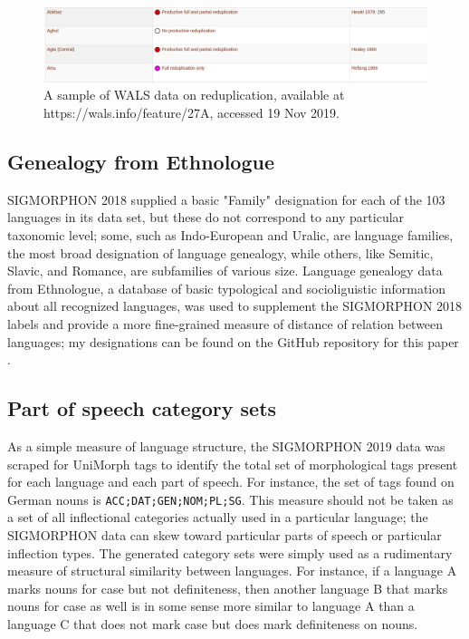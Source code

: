 \begin{figure}[ht]
\includegraphics[width=13.5cm]{images/WALS.png}
\centering
\caption{A sample of WALS data on reduplication, available at\\ https://wals.info/feature/27A, accessed 19 Nov 2019.}
\end{figure}

\subsection{Genealogy from Ethnologue}

SIGMORPHON 2018 supplied a basic "Family" designation for each of the 103 languages in its data set, but these do not correspond to any particular taxonomic level; some, such as Indo-European and Uralic, are language families, the most broad designation of language genealogy, while others, like Semitic, Slavic, and Romance, are subfamilies of various size. Language genealogy data from Ethnologue, a database of basic typological and socioliguistic information about all recognized languages, was used to supplement the SIGMORPHON 2018 labels and provide a more fine-grained measure of distance of relation between languages; my designations can be found on the GitHub repository for this paper \parencite{Ethnologue}.

\subsection{Part of speech category sets}

As a simple measure of language structure, the SIGMORPHON 2019 data was scraped for UniMorph tags to identify the total set of morphological tags present for each language and each part of speech. For instance, the set of tags found on German nouns is \texttt{ACC;DAT;GEN;NOM;PL;SG}. This measure should not be taken as a set of all inflectional categories actually used in a particular language; the SIGMORPHON data can skew toward particular parts of speech or particular inflection types. The generated category sets were simply used as a rudimentary measure of structural similarity between languages. For instance, if a language A marks nouns for case but not definiteness, then another language B that marks nouns for case as well is in some sense more similar to language A than a language C that does not mark case but does mark definiteness on nouns.

